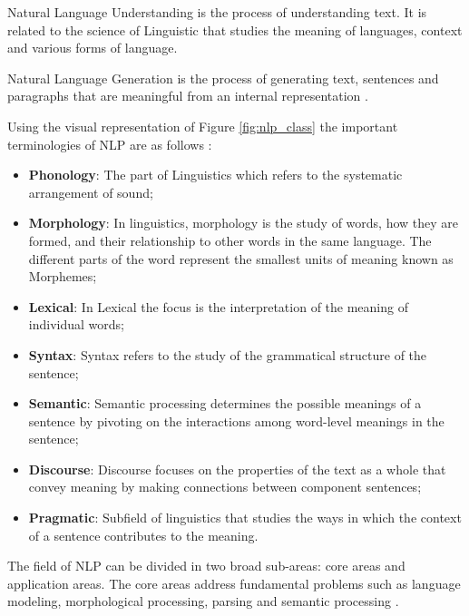 Natural Language Understanding is the process of understanding text. It is related to the science of Linguistic that studies the meaning of languages, context and various forms of language. 

Natural Language Generation is the process of generating text, sentences and
paragraphs that are meaningful from an internal representation \cite{Khurana2018}. 

Using the visual representation of Figure \ref{fig:nlp_class} the important terminologies of NLP are as follows \cite{Khurana2018}:

\begin{itemize}
    \item \textbf{Phonology}: The part of Linguistics which refers to the systematic arrangement of sound;
    \item \textbf{Morphology}: In linguistics, morphology is the study of words, how they are formed, and their relationship to other words in the same language. The different parts of the word represent the smallest units of meaning known as Morphemes;
    \item \textbf{Lexical}: In Lexical the focus is the interpretation of the meaning of individual words;
    \item \textbf{Syntax}: Syntax refers to the study of the grammatical structure of the sentence;
    \item  \textbf{Semantic}: Semantic processing determines the possible meanings of a
    sentence by pivoting on the interactions among word-level meanings in the sentence;
    \item \textbf{Discourse}: Discourse focuses on the properties of the text as a whole that convey meaning by making connections between component sentences;
    \item \textbf{Pragmatic}: Subfield of linguistics that studies the ways in which the context of a sentence contributes to the meaning. 
    
\end{itemize}

The field of NLP can be divided in two broad sub-areas: core areas and application areas. The core areas address fundamental problems such as language modeling, morphological processing, parsing and semantic processing \cite{Otter2018}. 



